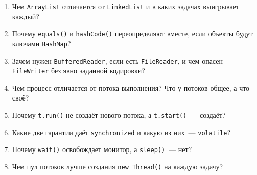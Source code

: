 \begin{enumerate}
\item Чем \texttt{ArrayList} отличается от \texttt{LinkedList} и в каких задачах
      выигрывает каждый?
\item Почему \texttt{equals()} и \texttt{hashCode()} переопределяют вместе, если
      объекты будут ключами \texttt{HashMap}?
\item Зачем нужен \texttt{BufferedReader}, если есть \texttt{FileReader}, и чем
      опасен \texttt{FileWriter} без явно заданной кодировки?
\item Чем процесс отличается от потока выполнения? Что у потоков общее, а что
      своё?
\item Почему \texttt{t.run()} не создаёт нового потока, а \texttt{t.start()}~---
      создаёт?
\item Какие две гарантии даёт \texttt{synchronized} и какую из них~---
      \texttt{volatile}?
\item Почему \texttt{wait()} освобождает монитор, а \texttt{sleep()}~--- нет?
\item Чем пул потоков лучше создания \texttt{new Thread()} на каждую задачу?
\end{enumerate}

\testzadaniya


